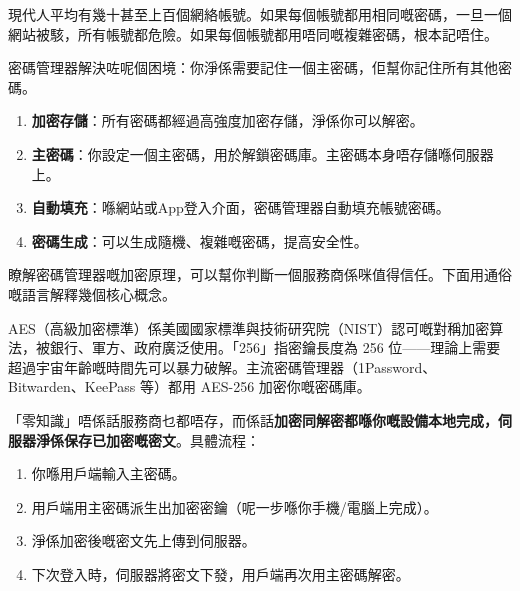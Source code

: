 


現代人平均有幾十甚至上百個網絡帳號。如果每個帳號都用相同嘅密碼，一旦一個網站被駭，所有帳號都危險。如果每個帳號都用唔同嘅複雜密碼，根本記唔住。

密碼管理器解決咗呢個困境：你淨係需要記住一個主密碼，佢幫你記住所有其他密碼。


\begin{enumerate}
  \item \textbf{加密存儲}：所有密碼都經過高強度加密存儲，淨係你可以解密。
  \item \textbf{主密碼}：你設定一個主密碼，用於解鎖密碼庫。主密碼本身唔存儲喺伺服器上。
  \item \textbf{自動填充}：喺網站或App登入介面，密碼管理器自動填充帳號密碼。
  \item \textbf{密碼生成}：可以生成隨機、複雜嘅密碼，提高安全性。
\end{enumerate}


瞭解密碼管理器嘅加密原理，可以幫你判斷一個服務商係咪值得信任。下面用通俗嘅語言解釋幾個核心概念。


AES（高級加密標準）係美國國家標準與技術研究院（NIST）認可嘅對稱加密算法，被銀行、軍方、政府廣泛使用。「256」指密鑰長度為 256 位——理論上需要超過宇宙年齡嘅時間先可以暴力破解。主流密碼管理器（1Password、Bitwarden、KeePass 等）都用 AES-256 加密你嘅密碼庫。


「零知識」唔係話服務商乜都唔存，而係話\textbf{加密同解密都喺你嘅設備本地完成，伺服器淨係保存已加密嘅密文}。具體流程：

\begin{enumerate}
  \item 你喺用戶端輸入主密碼。
  \item 用戶端用主密碼派生出加密密鑰（呢一步喺你手機/電腦上完成）。
  \item 淨係加密後嘅密文先上傳到伺服器。
  \item 下次登入時，伺服器將密文下發，用戶端再次用主密碼解密。
\end{enumerate}

